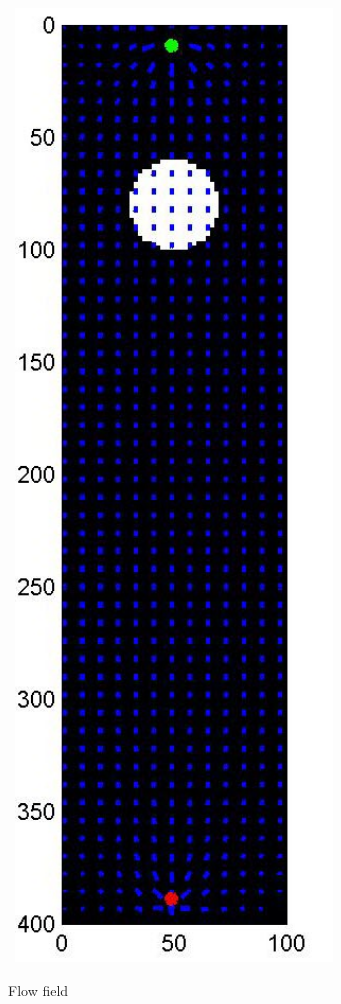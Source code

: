 \documentclass[12pt]{article}
\begin{document}
\begin{figure}[h!]
\begin{center}
\	\includegraphics[width=0.75\textwidth]{figures/flow}
\end{center}
\caption{Flow field}
\end{figure}
\end{document}
